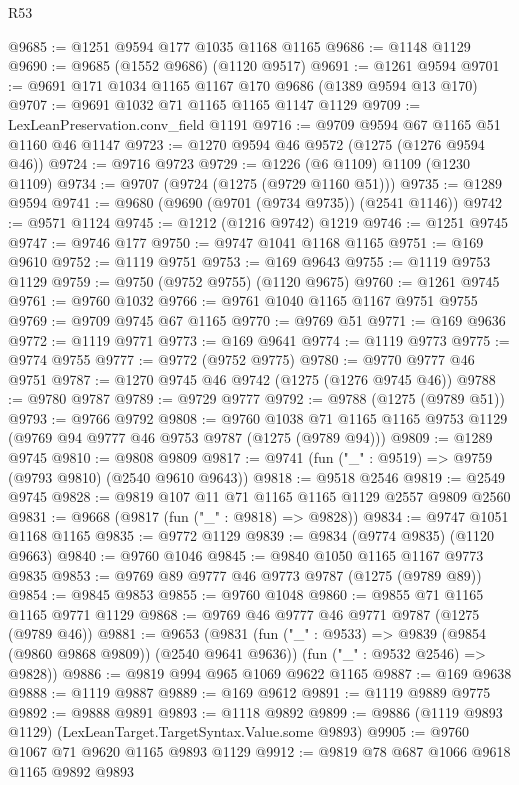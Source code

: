 \begin{lexlean}{R53}
\begin{coremodule}
@9685 := @1251 @9594 @177 @1035 @1168 @1165
@9686 := @1148 @1129
@9690 := @9685 (@1552 @9686) (@1120 @9517)
@9691 := @1261 @9594
@9701 := @9691 @171 @1034 @1165 @1167 @170 @9686 (@1389 @9594 @13 @170)
@9707 := @9691 @1032 @71 @1165 @1165 @1147 @1129
@9709 := LexLeanPreservation.conv_field @1191
@9716 := @9709 @9594 @67 @1165 @51 @1160 @46 @1147
@9723 := @1270 @9594 @46 @9572 (@1275 (@1276 @9594 @46))
@9724 := @9716 @9723
@9729 := @1226 (@6 @1109) @1109 (@1230 @1109)
@9734 := @9707 (@9724 (@1275 (@9729 @1160 @51)))
@9735 := @1289 @9594
@9741 := @9680 (@9690 (@9701 (@9734 @9735)) (@2541 @1146))
@9742 := @9571 @1124
@9745 := @1212 (@1216 @9742) @1219
@9746 := @1251 @9745
@9747 := @9746 @177
@9750 := @9747 @1041 @1168 @1165
@9751 := @169 @9610
@9752 := @1119 @9751
@9753 := @169 @9643
@9755 := @1119 @9753 @1129
@9759 := @9750 (@9752 @9755) (@1120 @9675)
@9760 := @1261 @9745
@9761 := @9760 @1032
@9766 := @9761 @1040 @1165 @1167 @9751 @9755
@9769 := @9709 @9745 @67 @1165
@9770 := @9769 @51
@9771 := @169 @9636
@9772 := @1119 @9771
@9773 := @169 @9641
@9774 := @1119 @9773
@9775 := @9774 @9755
@9777 := @9772 (@9752 @9775)
@9780 := @9770 @9777 @46 @9751
@9787 := @1270 @9745 @46 @9742 (@1275 (@1276 @9745 @46))
@9788 := @9780 @9787
@9789 := @9729 @9777
@9792 := @9788 (@1275 (@9789 @51))
@9793 := @9766 @9792
@9808 := @9760
    @1038
    @71
    @1165
    @1165
    @9753
    @1129
    (@9769 @94 @9777 @46 @9753 @9787 (@1275 (@9789 @94)))
@9809 := @1289 @9745
@9810 := @9808 @9809
@9817 := @9741 (fun ("_" : @9519) => @9759 (@9793 @9810) (@2540 @9610 @9643))
@9818 := @9518 @2546
@9819 := @2549 @9745
@9828 := @9819 @107 @11 @71 @1165 @1165 @1129 @2557 @9809 @2560
@9831 := @9668 (@9817 (fun ("_" : @9818) => @9828))
@9834 := @9747 @1051 @1168 @1165
@9835 := @9772 @1129
@9839 := @9834 (@9774 @9835) (@1120 @9663)
@9840 := @9760 @1046
@9845 := @9840 @1050 @1165 @1167 @9773 @9835
@9853 := @9769 @89 @9777 @46 @9773 @9787 (@1275 (@9789 @89))
@9854 := @9845 @9853
@9855 := @9760 @1048
@9860 := @9855 @71 @1165 @1165 @9771 @1129
@9868 := @9769 @46 @9777 @46 @9771 @9787 (@1275 (@9789 @46))
@9881 := @9653
    (@9831
      (fun ("_" : @9533) => @9839 (@9854 (@9860 @9868 @9809)) (@2540 @9641 @9636))
      (fun ("_" : @9532 @2546) => @9828))
@9886 := @9819 @994 @965 @1069 @9622 @1165
@9887 := @169 @9638
@9888 := @1119 @9887
@9889 := @169 @9612
@9891 := @1119 @9889 @9775
@9892 := @9888 @9891
@9893 := @1118 @9892
@9899 := @9886 (@1119 @9893 @1129) (LexLeanTarget.TargetSyntax.Value.some @9893)
@9905 := @9760 @1067 @71 @9620 @1165 @9893 @1129
@9912 := @9819 @78 @687 @1066 @9618 @1165 @9892 @9893

\end{coremodule}
\end{lexlean}
